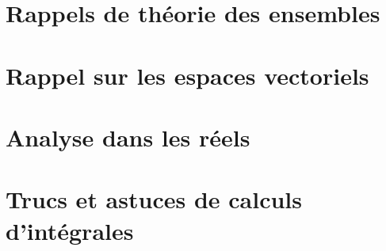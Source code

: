 \chapter{Rappels de théorie des ensembles}


\chapter{Rappel sur les espaces vectoriels}    \label{AppendiceEspVectoriels}


\chapter{Analyse dans les réels}        \label{AppendiceAnalyseR}


\chapter{Trucs et astuces de calculs d'intégrales}







